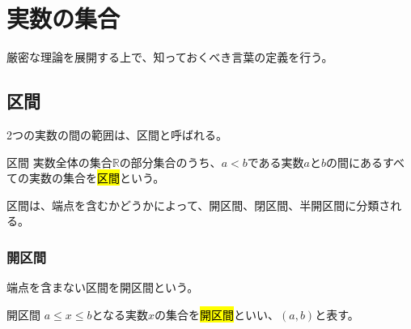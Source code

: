 \documentclass[../../math-imaging]{subfiles}
\begin{document}
\section{実数の集合}

厳密な理論を展開する上で、知っておくべき言葉の定義を行う。

\subsection{区間}

2つの実数の間の範囲は、区間と呼ばれる。

\begin{definition}{区間}
  \newline
  実数全体の集合$\mathbb{R} $の部分集合のうち、$a<b$である実数$a$と$b$の間にあるすべての実数の集合を\hl{区間}という。
\end{definition}

区間は、端点を含むかどうかによって、開区間、閉区間、半開区間に分類される。

\subsubsection{開区間}

端点を含まない区間を開区間という。

\begin{definition}{開区間}
  $a \leq x \leq b$となる実数$x$の集合を\hl{開区間}といい、$(a,b)$と表す。
\end{definition}

\begin{center}
\end{center}

\begin{center}
\end{center}
\end{document}
